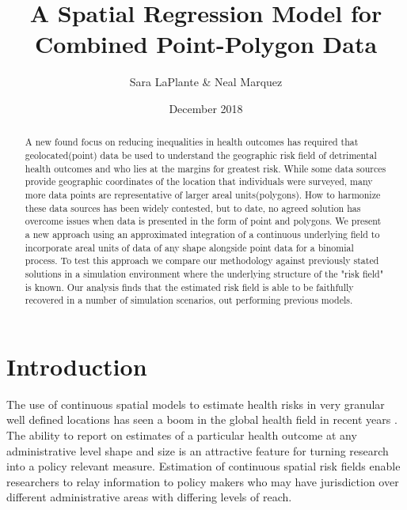 \documentclass{article}
\begin{document}
\title{A Spatial Regression Model for Combined Point-Polygon Data}
\author{Sara LaPlante \& Neal Marquez}
\date{December 2018}

\maketitle

\begin{abstract}
A new found focus on reducing inequalities in health outcomes has required that geolocated(point) data be used to understand the geographic risk field of detrimental health outcomes and who lies at the margins for greatest risk. While some data sources provide geographic coordinates of the location that individuals were surveyed, many more data points are representative of larger areal units(polygons). How to harmonize these data sources has been widely contested, but to date, no agreed solution has overcome issues when data is presented in the form of point and polygons. We present a new approach using an approximated integration of a continuous underlying field to incorporate areal units of data of any shape alongside point data for a binomial process.  To test this approach we compare our methodology against previously stated solutions in a simulation environment where the underlying structure of the "risk field" is known. Our analysis finds that the estimated risk field is able to be faithfully recovered in a number of simulation scenarios, out performing previous models. 
\end{abstract}

\section{Introduction}\label{introduction}

The use of continuous spatial models to estimate health risks in very granular well defined locations has seen a boom in the global health field in recent years \cite{Bosco2017, Burke2016, Gething2015, Golding2017, Utazi2018a, Wakefield2017}. The ability to report on estimates of a particular health outcome at any administrative level shape and size is an attractive feature for turning research into a policy relevant measure. Estimation of continuous spatial risk fields enable researchers to relay information to policy makers who may have jurisdiction over different administrative areas with differing levels of reach. 
\end{document}
